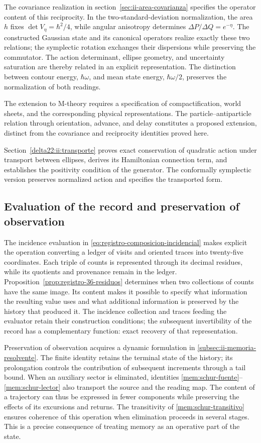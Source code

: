 The covariance realization in
section~\ref{sec:ii-area-covarianza} specifies the operator content of
this reciprocity. In the two-standard-deviation normalization,
the area \(h\) fixes
\(\det V_\eta=\hbar^2/4\), while angular anisotropy determines
\(\Delta P/\Delta Q=e^{-\eta}\). The constructed Gaussian state and its
canonical operators realize exactly these two relations; the
symplectic rotation exchanges their dispersions while preserving the
commutator. The action determinant,
ellipse geometry, and uncertainty saturation are thereby related in an
explicit representation. The distinction between contour energy,
\(\hbar\omega\), and mean state energy,
\(\hbar\omega/2\), preserves the normalization of both readings.

The extension to M-theory requires a specification of compactification,
world sheets, and the corresponding physical representations.
The particle--antiparticle relation through orientation, advance, and
delay constitutes a proposed extension, distinct from the covariance
and reciprocity identities proved here.

Section~\ref{delta22:ii:transporte} proves exact conservation of
quadratic action under transport between ellipses, derives its
Hamiltonian connection term, and establishes the positivity condition
of the generator. The conformally symplectic version preserves
normalized action and specifies the transported form.

\subsection{Evaluation of the record and preservation of observation}

The incidence evaluation in
\eqref{eq:registro-composicion-incidencial} makes explicit the operation
converting a ledger of visits and oriented traces into twenty-five
coordinates. Each triple of counts is represented through its decimal
residues, while its quotients and provenance remain in the ledger.
Proposition~\ref{prop:registro-36-residuos} determines when two
collections of counts have the same image. Its content makes it possible
to specify what information the resulting value uses and what additional
information is preserved by the history that produced it. The incidence collection
and traces feeding the evaluator retain their construction
conditions; the subsequent invertibility of the record has a
complementary function: exact recovery of that representation.

Preservation of observation acquires a dynamic formulation in
\ref{subsec:ii-memoria-resolvente}. The finite identity retains the terminal
state of the history; its prolongation controls the contribution of
subsequent increments through a tail bound. When an
auxiliary sector is eliminated, identities
\eqref{mem:schur-fuente}--\eqref{mem:schur-lector} also transport
the source and the reading map. The content of a trajectory
can thus be expressed in fewer components while preserving the effects of
its excursions and returns. The transitivity of
\eqref{mem:schur-transitivo} ensures coherence of this operation
when elimination proceeds in several stages. This is a
precise consequence of treating memory as an operative part of the state.

